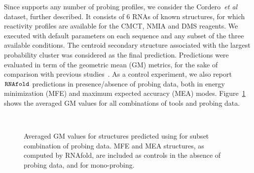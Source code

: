 \documentclass[a4,center,fleqn]{NAR}
\begin{document}
Since \OurTool{} supports any number of probing profiles, we consider the Cordero~\emph{et al} dataset, further described. It consists of 6 RNAs of known structures, for which reactivity profiles are available for the CMCT, NMIA and DMS reagents. We executed \OurTool{} with default parameters on each sequence and any subset of the three available conditions. The centroid secondary structure  associated with the largest probability cluster was considered as the final prediction. Predictions were evaluated in term of the geometric mean (GM) metrics, for the sake of comparison with previous studies~\cite{Spasic2017}. As a control experiment, we also report ${\tt RNAfold}$ predictions in presence/absence of probing data, both in energy minimization (MFE) and maximum expected accuracy (MEA) modes. Figure~\ref{cordero1} shows the averaged GM values for all combinations of tools and probing data.



\begin{figure}
	{\\}
	
	\caption{Averaged GM values for structures  predicted using \OurTool{} for subset combination of probing data. MFE and MEA structures, as computed by RNAfold, are included as controls in the absence of probing data, and for mono-probing.}
	\label{cordero1}
\end{figure}
\end{document}
